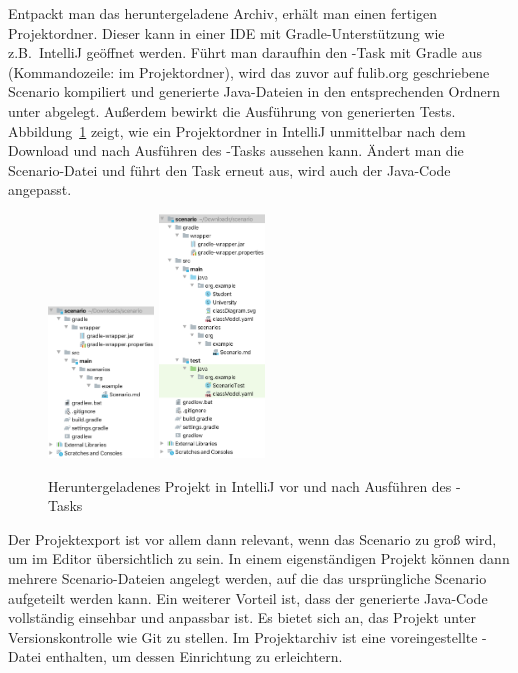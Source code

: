 Entpackt man das heruntergeladene Archiv, erhält man einen fertigen Projektordner.
Dieser kann in einer IDE mit Gradle-Unterstützung wie z.B.\ IntelliJ geöffnet werden.
Führt man daraufhin den -Task mit Gradle aus (Kommandozeile:  im Projektordner), wird das zuvor auf fulib.org geschriebene Scenario kompiliert und generierte Java-Dateien in den entsprechenden Ordnern unter  abgelegt.
Außerdem bewirkt  die Ausführung von generierten Tests.
Abbildung~\ref{fig:project-downloaded} zeigt, wie ein Projektordner in IntelliJ unmittelbar nach dem Download und nach Ausführen des -Tasks aussehen kann.
Ändert man die Scenario-Datei und führt den Task erneut aus, wird auch der Java-Code angepasst.

\begin{figure}
    \centering
    \includegraphics[width=0.25\textwidth]{chapter/fulib.org/img/project-downloaded.png}
    \hspace{0.05\textwidth}
    \includegraphics[width=0.25\textwidth]{chapter/fulib.org/img/project-post-check.png}
    \caption{Heruntergeladenes Projekt in IntelliJ vor und nach Ausführen des -Tasks}
    \label{fig:project-downloaded}
\end{figure}

Der Projektexport ist vor allem dann relevant, wenn das Scenario zu groß wird, um im Editor übersichtlich zu sein.
In einem eigenständigen Projekt können dann mehrere Scenario-Dateien angelegt werden, auf die das ursprüngliche Scenario aufgeteilt werden kann.
Ein weiterer Vorteil ist, dass der generierte Java-Code vollständig einsehbar und anpassbar ist.
Es bietet sich an, das Projekt unter Versionskontrolle wie Git zu stellen.
Im Projektarchiv ist eine voreingestellte -Datei enthalten, um dessen Einrichtung zu erleichtern.

